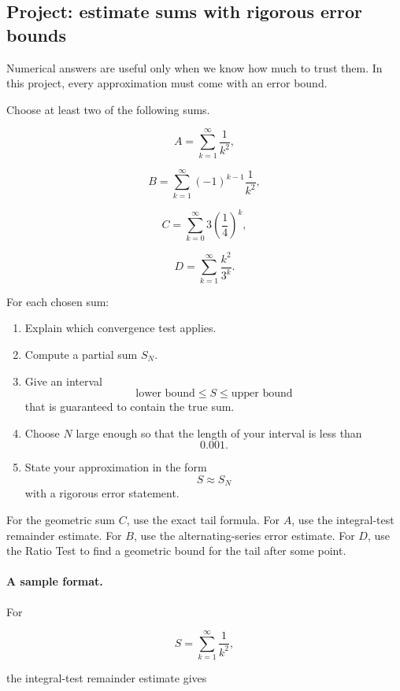 \subsection{Project: estimate sums with rigorous error bounds}
\label{subsec:project-estimate-sums-rigorous-error-bounds}

Numerical answers are useful only when we know how much to trust them.  In this
project, every approximation must come with an error bound.

Choose at least two of the following sums.

\[
A=\sum_{k=1}^{\infty}\frac1{k^2},
\]

\[
B=\sum_{k=1}^{\infty}(-1)^{k-1}\frac1{k^2},
\]

\[
C=\sum_{k=0}^{\infty}3\left(\frac14\right)^k,
\]

\[
D=\sum_{k=1}^{\infty}\frac{k^2}{3^k}.
\]

For each chosen sum:

\begin{enumerate}
\item Explain which convergence test applies.

\item Compute a partial sum \(S_N\).

\item Give an interval
\[
\text{lower bound}\le S\le \text{upper bound}
\]
that is guaranteed to contain the true sum.

\item Choose \(N\) large enough so that the length of your interval is less than
\[
0.001.
\]

\item State your approximation in the form
\[
S\approx S_N
\]
with a rigorous error statement.
\end{enumerate}

For the geometric sum \(C\), use the exact tail formula.  For \(A\), use the integral-test
remainder estimate.  For \(B\), use the alternating-series error estimate.  For \(D\), use
the Ratio Test to find a geometric bound for the tail after some point.

\paragraph{A sample format.}
For

\[
S=\sum_{k=1}^{\infty}\frac1{k^2},
\]

the integral-test remainder estimate gives

